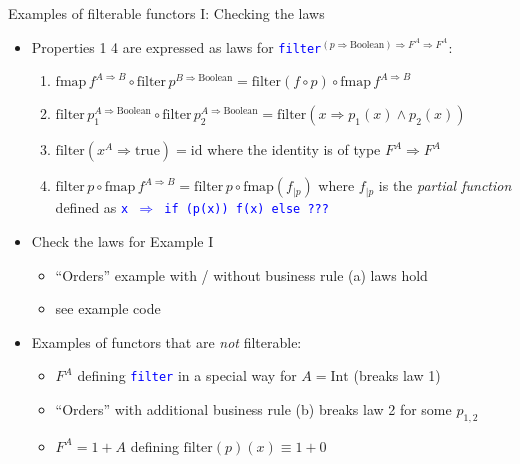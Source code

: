 \documentclass[english]{beamer}
\begin{document}
\begin{frame}{Examples of filterable functors I: Checking the laws}

\begin{itemize}
\item Properties 1 \textendash{} 4 are expressed as laws for \texttt{\textcolor{blue}{\footnotesize{}filter}}$^{(p\Rightarrow\text{Boolean})\Rightarrow F^{A}\Rightarrow F^{A}}$:
\begin{enumerate}
\item {\footnotesize{}$\text{fmap}\,f^{A\Rightarrow B}\circ\text{filter}\,p^{B\Rightarrow\text{Boolean}}=\text{filter}\left(f\circ p\right)\circ\text{fmap}\,f^{A\Rightarrow B}$}{\footnotesize \par}
\item {\footnotesize{}$\text{filter}\,p_{1}^{A\Rightarrow\text{Boolean}}\circ\text{filter}\,p_{2}^{A\Rightarrow\text{Boolean}}=\text{filter}\left(x\Rightarrow p_{1}(x)\wedge p_{2}(x)\right)$}{\footnotesize \par}
\item {\footnotesize{}$\text{filter}\left(x^{A}\Rightarrow\text{true}\right)=\text{id}$
}where the identity is of type {\footnotesize{}$F^{A}\Rightarrow F^{A}$}{\footnotesize \par}
\item {\footnotesize{}$\text{filter}\,p\circ\text{fmap}\,f^{A\Rightarrow B}=\text{filter}\,p\circ\text{fmap}\left(f_{|p}\right)$
}where {\footnotesize{}$f_{|p}$} is the \emph{partial function} defined
as \texttt{\textcolor{blue}{\footnotesize{}x $\Rightarrow$ if (p(x))
f(x) else ???}} 
\end{enumerate}
\item Check the laws for Example I
\begin{itemize}
\item ``Orders'' example with / without business rule (a) \textendash{}
laws hold
\item see example code
\end{itemize}
\item Examples of functors that are \emph{not} filterable:
\begin{itemize}
\item $F^{A}$ defining \texttt{\textcolor{blue}{\footnotesize{}filter}}
in a special way for $A=\text{Int}$ (breaks law 1)
\item ``Orders'' with additional business rule (b) \textendash{} breaks
law 2 for some $p_{1,2}$
\item $F^{A}=1+A$ defining $\text{filter}\left(p\right)\left(x\right)\equiv1+0$

\end{itemize}
\end{itemize}
\end{frame}
\end{document}
